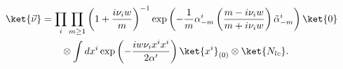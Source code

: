 \begin{equation}
\begin{split}
 \ket{\vec \nu}&= \prod_i
  \prod_{m \geq 1}  \left(1 + \frac{i \nu_i w}{m} \right)^{-1}
   \exp \left( - \frac{1}{m}\alpha^i_{-m}
   \left(\frac{m-i \nu_i w}{m+i\nu_i w} 
  \right) \tilde \alpha^i_{-m}\right ) \ket{0} \\ & \qquad \otimes 
   \int dx^i \exp \left(-\frac{i w \nu_i x^i x^i}{2 \alpha'} \right) 
   \ket{x^i}_{(0)} \otimes \ket{N_{lc}} . 
\end{split}
\end{equation}

